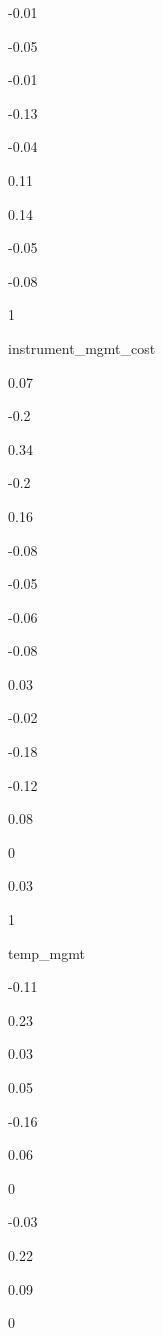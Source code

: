 \documentclass[
]{article}
\begin{document}
{-0.01}

{-0.05}

{-0.01}

{-0.13}

{-0.04}

{0.11 }

{0.14 }

{-0.05}

{-0.08}

{1 }

{ }

{ }

{ }

{ }

{ }

{ }

{ }

{ }

instrument\_mgmt\_cost

{0.07 }

{-0.2 }

{0.34 }

{-0.2 }

{0.16 }

{-0.08}

{-0.05}

{-0.06}

{-0.08}

{0.03 }

{-0.02}

{-0.18}

{-0.12}

{0.08 }

{0 }

{0.03 }

{1 }

{ }

{ }

{ }

{ }

{ }

{ }

{ }

temp\_mgmt

{-0.11}

{0.23 }

{0.03 }

{0.05 }

{-0.16}

{0.06 }

{0 }

{-0.03}

{0.22 }

{0.09 }

{0 }
\end{document}
